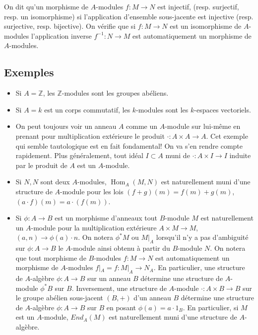 \documentclass[a4paper, oneside, 12pt]{book}
\theoremstyle{theoremeStyle} %
\theoremstyle{definition} %
\DeclareMathOperator{\SHom}{Hom}
\newcommand{\Z}{\mathbb{Z}}
\begin{document}
 On dit qu'un morphisme de $A$-modules $f:M\rightarrow N$ est injectif, (resp. surjectif, resp. un isomorphisme) si l'application d'ensemble sous-jacente est injective (resp. surjective, resp. bijective). On vérifie que si   $f:M\rightarrow N$ est un isomorphisme de $A$-modules l'application inverse $f^{-1}:N\rightarrow M$ est automatiquement un morphisme de $A$-modules.

 \subsection{Exemples}
\begin{itemize}[leftmargin=* ,parsep=0cm,itemsep=0cm,topsep=0cm]
\item  Si $A=\Z$, les $\Z$-modules sont les groupes abéliens.\\
\item  Si $A=k$ est un corps commutatif, les $k$-modules sont les $k$-espaces vectoriels.\\
\item On peut toujours voir un anneau $A$ comme un $A$-module sur lui-même en prenant pour multiplication extérieure le produit $\cdot:A\times A\rightarrow A$. Cet exemple qui semble tautologique est en fait fondamental! On va s'en rendre compte rapidement. Plus généralement, tout idéal $I\subset A$ muni de $\cdot:A\times I\rightarrow I$ induite par le produit de $A$ est un $A$-module.
\item Si $N,N$ sont deux $A$-modules, $\SHom_A(M,N)$ est naturellement muni d'une structure de $A$-module pour les lois $(f+g)(m)=f(m)+g(m)$, $(a\cdot f)(m)=a\cdot (f(m))$.
\item Si $\phi:A\rightarrow B$ est un morphisme d'anneaux tout $B$-module $M$ est naturellement un $A$-module pour la multiplication extérieure $ A\times M\rightarrow M$, $(a,n)\rightarrow \phi(a)\cdot n$. On notera $\phi^*M$ ou $M|_A$ lorsqu'il n'y a pas d'ambiguité sur $\phi:A\rightarrow B$ le $A$-module ainsi obtenu à partir du $B$-module $N$. On notera que tout morphisme de $B$-modules $f:M\rightarrow N$ est automatiquement un morphisme de $A$-modules $f|_A=f:M|_A\rightarrow N_A$. En particulier,  une structure de $A$-algèbre $\phi:A\rightarrow B$ sur un anneau $B$ détermine une structure de $A$-module $\phi^*B$ sur $B$. Inversement, une structure de $A$-module $\cdot:A\times B\rightarrow B$ sur le   groupe abélien sous-jacent $(B,+)$ d'un anneau  $B$ détermine une structure de $A$-algèbre $\phi:A\rightarrow B$ sur $B$ en posant $\phi(a)=a\cdot 1_B$. En particulier, si $M$ est un $A$-module, $End_A(M)$ est naturellement muni d'une structure de $A$-algèbre.

\end{itemize}
\end{document}
